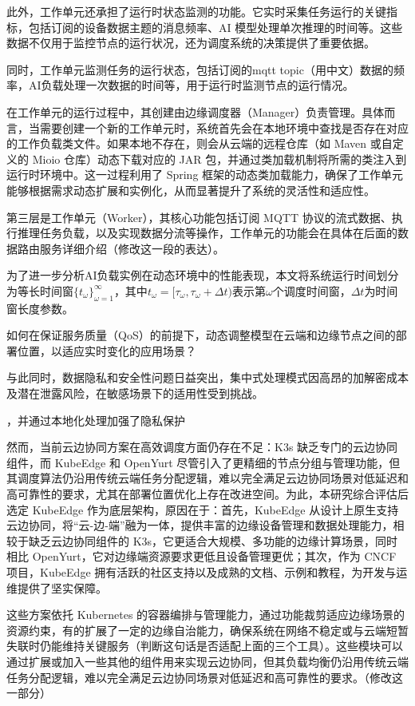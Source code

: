 此外，工作单元还承担了运行时状态监测的功能。它实时采集任务运行的关键指标，包括订阅的设备数据主题的消息频率、AI 模型处理单次推理的时间等。这些数据不仅用于监控节点的运行状况，还为调度系统的决策提供了重要依据。

同时，工作单元监测任务的运行状态，包括订阅的mqtt topic（用中文）数据的频率，AI负载处理一次数据的时间等，用于运行时监测节点的运行情况。

在工作单元的运行过程中，其创建由边缘调度器（Manager）负责管理。具体而言，当需要创建一个新的工作单元时，系统首先会在本地环境中查找是否存在对应的工作负载类文件。如果本地不存在，则会从云端的远程仓库（如 Maven 或自定义的 Mioio 仓库）动态下载对应的 JAR 包，并通过类加载机制将所需的类注入到运行时环境中。这一过程利用了 Spring 框架的动态类加载能力，确保了工作单元能够根据需求动态扩展和实例化，从而显著提升了系统的灵活性和适应性。

第三层是工作单元（Worker），其核心功能包括订阅 MQTT 协议的流式数据、执行推理任务负载，以及实现数据分流等操作，工作单元的功能会在具体在后面的数据路由服务详细介绍（修改这一段的表达）。


为了进一步分析AI负载实例在动态环境中的性能表现，本文将系统运行时间划分为等长时间窗$\{t_\omega\}_{\omega=1}^\infty$，其中$t_\omega = [\tau_\omega, \tau_\omega + \Delta t)$表示第$\omega$个调度时间窗，$\Delta t$为时间窗长度参数。

如何在保证服务质量（QoS）的前提下，动态调整模型在云端和边缘节点之间的部署位置，以适应实时变化的应用场景？


与此同时，数据隐私和安全性问题日益突出，集中式处理模式因高昂的加解密成本及潜在泄露风险，在敏感场景下的适用性受到挑战\cite{soveizi2023security}。

，并通过本地化处理加强了隐私保护

然而，当前云边协同方案在高效调度方面仍存在不足：K3s 缺乏专门的云边协同组件，而 KubeEdge 和 OpenYurt 尽管引入了更精细的节点分组与管理功能，但其调度算法仍沿用传统云端任务分配逻辑，难以完全满足云边协同场景对低延迟和高可靠性的要求，尤其在部署位置优化上存在改进空间。为此，本研究综合评估后选定 KubeEdge 作为底层架构，原因在于：首先，KubeEdge 从设计上原生支持云边协同，将“云-边-端”融为一体，提供丰富的边缘设备管理和数据处理能力，相较于缺乏云边协同组件的 K3s，它更适合大规模、多功能的边缘计算场景，同时相比 OpenYurt，它对边缘端资源要求更低且设备管理更优；其次，作为 CNCF 项目，KubeEdge 拥有活跃的社区支持以及成熟的文档、示例和教程，为开发与运维提供了坚实保障。


这些方案依托 Kubernetes 的容器编排与管理能力，通过功能裁剪适应边缘场景的资源约束，有的扩展了一定的边缘自治能力，确保系统在网络不稳定或与云端短暂失联时仍能维持关键服务（判断这句话是否适配上面的三个工具）。这些模块可以通过扩展或加入一些其他的组件用来实现云边协同，但其负载均衡仍沿用传统云端任务分配逻辑，难以完全满足云边协同场景对低延迟和高可靠性的要求。（修改这一部分）

